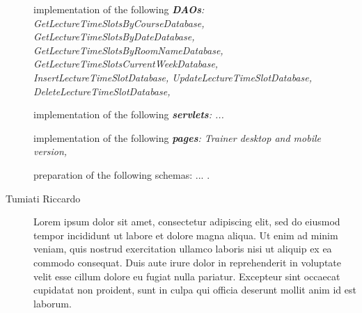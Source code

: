 \begin{description}
	implementation of the following \textit{\textbf{DAOs}:
	    GetLectureTimeSlotsByCourseDatabase,
	    GetLectureTimeSlotsByDateDatabase,
	    GetLectureTimeSlotsByRoomNameDatabase,
	    GetLectureTimeSlotsCurrentWeekDatabase,
	    InsertLectureTimeSlotDatabase,
	    UpdateLectureTimeSlotDatabase,
	    DeleteLectureTimeSlotDatabase,
	}
    
	implementation of the following \textit{\textbf{servlets}: 
	    ... 
    }
    
	implementation of the following \textit{\textbf{pages}: 
	    Trainer desktop and mobile version,
    }
    
    preparation of the following schemas: ... .
	\item[Tumiati Riccardo] Lorem ipsum dolor sit amet, consectetur adipiscing elit, sed do eiusmod tempor incididunt ut labore et dolore magna aliqua. Ut enim ad minim veniam, quis nostrud exercitation ullamco laboris nisi ut aliquip ex ea commodo consequat. Duis aute irure dolor in reprehenderit in voluptate velit esse cillum dolore eu fugiat nulla pariatur. Excepteur sint occaecat cupidatat non proident, sunt in culpa qui officia deserunt mollit anim id est laborum.
\end{description}
